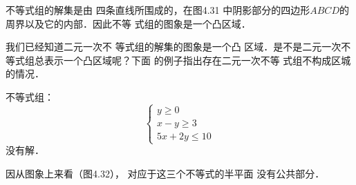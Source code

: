 \begin{solution}
不等式组的解集是由
四条直线所围成的，在图4.31
中阴影部分的四边形$ABCD$的
周界以及它的内部．因此不等
式组的图象是一个凸区域．
\end{solution}

我们已经知道二元一次不
等式组的解集的图象是一个凸
区域．是不是二元一次不等式组总表示一个凸区域呢？下面
的例子指出存在二元一次不等
式组不构成区城的情况．

\begin{example}
   不等式组：
   \[\begin{cases}
    y\ge 0\\
    x-y\ge 3\\
    5x+2y\le 10    
   \end{cases}\]
没有解． 
\end{example}

\begin{solution}
    因从图象上来看（图4.32），
对应于这三个不等式的半平面
没有公共部分．


\end{solution}

